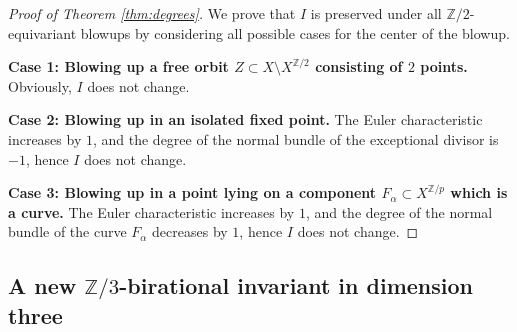 \documentclass[12pt,a4paper]{amsart}
\theoremstyle{definition}
\theoremstyle{remark}
\begin{document}
\begin{proof}[Proof of Theorem \ref{thm:degrees}]
   
We prove that \( I \) is preserved under all \( \mathbb{Z}/2 \)-equivariant blowups by considering all possible cases for the center of the blowup.
\medskip

\noindent\textbf{Case 1: Blowing up a free orbit \( Z \subset X \setminus X^{\mathbb{Z}/2} \) consisting of $2$ points.} \\
Obviously, $I$ does not change.

\medskip
\noindent\textbf{Case 2: Blowing up in an isolated fixed point.} The Euler characteristic increases by $1$, and the degree of the normal bundle of the exceptional divisor is $-1$, hence $I$ does not change.


\medskip
\noindent\textbf{Case 3: Blowing up in a point lying on a component \(F_\alpha\subset X^{\mathbb{Z}/p} \)  which is a curve.} The Euler characteristic increases by $1$, and the degree of the normal bundle of the curve \(F_\alpha\) decreases by $1$, hence $I$ does not change.
\end{proof}


\subsection{A new  $\mathbb Z/3$-birational invariant in dimension three}
\label{sec:dimension-3}
\end{document}
